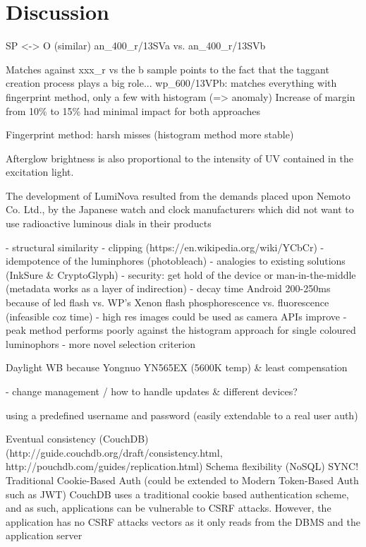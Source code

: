 \documentclass[thesis.tex]{subfiles}
\begin{document}
\chapter{Discussion}
\label{chapter:discussion}

SP <-> O (similar)
an\_400\_r/13SVa vs. an\_400\_r/13SVb

Matches against xxx\_r vs the b sample points to the fact that the taggant creation process plays a big role...
wp\_600/13VPb: matches everything with fingerprint method, only a few with histogram (=> anomaly)
Increase of margin from 10\% to 15\% had minimal impact for both approaches

Fingerprint method: harsh misses (histogram method more stable)

Afterglow brightness is also proportional to the intensity of UV contained in the excitation light.

The development of LumiNova resulted from the demands placed upon Nemoto  Co. Ltd.,  by the Japanese watch and clock manufacturers which did not want to use radioactive luminous dials in their products

- structural similarity
- clipping (https://en.wikipedia.org/wiki/YCbCr)
- idempotence of the luminphores (photobleach)
- analogies to existing solutions (InkSure \& CryptoGlyph)
- security: get hold of the device or man-in-the-middle (metadata works as a layer of indirection)
- decay time Android 200-250ms because of led flash vs. WP's Xenon flash
phosphorescence vs. fluorescence (infeasible coz time)
- high res images could be used as camera APIs improve
- peak method performs poorly against the histogram approach for single coloured luminophors
- more novel selection criterion

Daylight WB because Yongnuo YN565EX (5600K temp) \& least compensation

- change management / how to handle updates \& different devices?

using a predefined username and password (easily extendable to a real user auth)

Eventual consistency (CouchDB) (http://guide.couchdb.org/draft/consistency.html, http://pouchdb.com/guides/replication.html)
Schema flexibility (NoSQL) SYNC!
Traditional Cookie-Based Auth (could be extended to Modern Token-Based Auth such as JWT)
CouchDB uses a traditional cookie based authentication scheme, and as such, applications can be vulnerable to CSRF attacks. However, the application has no CSRF attacks vectors as it only reads from the DBMS and the application server
\end{document}

